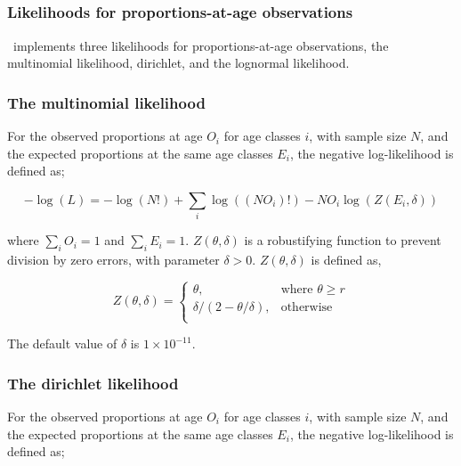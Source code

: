 \subsection{\label{sec:likelihood-observations}}

\subsubsection{Likelihoods for proportions-at-age observations}
\CNAME\ implements three likelihoods for proportions-at-age observations, the multinomial likelihood, dirichlet, and the lognormal likelihood. 

\subsubsection*{The multinomial likelihood}
For the observed proportions at age $O_i$ for age classes $i$, with sample size $N$, and the expected proportions at the same age classes $E_i$, the negative log-likelihood is defined as; 

\begin{equation}
-\log \left(L \right) =  -\log \left(N! \right) + \sum\limits_i \log \left( \left(NO_i \right)! \right) - NO_i \log \left(Z \left(E_i,\delta \right) \right)
\end{equation}

where $\sum\limits_i O_i = 1$ and $\sum\limits_i E_i = 1$. $Z \left(\theta,\delta \right)$ is a robustifying function to prevent division by zero errors, with parameter $\delta>0$. $Z \left(\theta,\delta \right)$ is defined as,

\begin{equation}
Z \left(\theta,\delta \right) = \begin{cases}
\theta, & \text{where $\theta \ge r$} \\
\delta/\left( 2-\theta/\delta \right), & \text{otherwise} \\  
\end{cases}
\end{equation}

The default value of $\delta$ is $1 \times 10^{-11}$.
\subsubsection*{The dirichlet likelihood}

For the observed proportions at age $O_i$ for age classes $i$, with sample size $N$, and the expected proportions at the same age classes $E_i$, the negative log-likelihood is defined as; 

